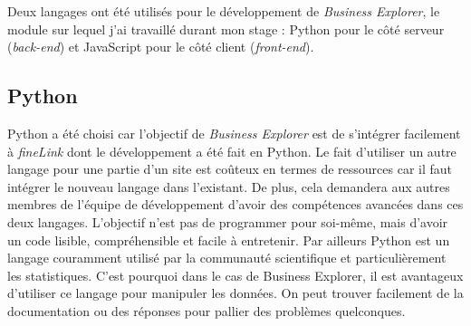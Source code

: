 Deux langages ont été utilisés pour le développement de \textit{Business Explorer}, le module sur lequel j'ai travaillé durant mon stage : Python pour le côté serveur (\textit{back-end}) et JavaScript pour le côté client (\textit{front-end}).\\

\subsection{Python}
Python a été choisi car l'objectif de \textit{Business Explorer} est de s'intégrer facilement à \textit{fineLink} dont le développement a été fait en Python. Le fait d'utiliser un autre langage pour une partie d'un site est coûteux en termes de ressources car il faut intégrer le nouveau langage dans l'existant. De plus, cela demandera aux autres membres de l'équipe de développement d'avoir des compétences avancées dans ces deux langages. L'objectif n'est pas de programmer pour soi-même, mais d'avoir un code lisible, compréhensible et facile à entretenir. Par ailleurs Python est un langage couramment utilisé par la communauté scientifique et particulièrement les statistiques. C'est pourquoi dans le cas de Business Explorer, il est avantageux d'utiliser ce langage pour manipuler les données. On peut trouver facilement de la documentation ou des réponses pour pallier des problèmes quelconques.\\

